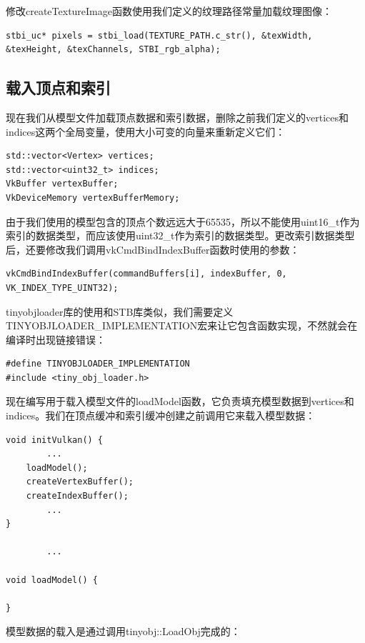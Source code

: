 \documentclass{ctexart}
\begin{document}
修改createTextureImage函数使用我们定义的纹理路径常量加载纹理图像：

\begin{lstlisting}[language={[ANSI]C}]
stbi_uc* pixels = stbi_load(TEXTURE_PATH.c_str(), &texWidth, &texHeight, &texChannels, STBI_rgb_alpha);
\end{lstlisting}

\subsection{载入顶点和索引}

现在我们从模型文件加载顶点数据和索引数据，删除之前我们定义的vertices和indices这两个全局变量，使用大小可变的向量来重新定义它们：

\begin{lstlisting}[language={[ANSI]C}]
std::vector<Vertex> vertices;
std::vector<uint32_t> indices;
VkBuffer vertexBuffer;
VkDeviceMemory vertexBufferMemory;
\end{lstlisting}

由于我们使用的模型包含的顶点个数远远大于65535，所以不能使用uint16\_t作为索引的数据类型，而应该使用uint32\_t作为索引的数据类型。更改索引数据类型后，还要修改我们调用vkCmdBindIndexBuffer函数时使用的参数：

\begin{lstlisting}[language={[ANSI]C}]
vkCmdBindIndexBuffer(commandBuffers[i], indexBuffer, 0, VK_INDEX_TYPE_UINT32);
\end{lstlisting}

tinyobjloader库的使用和STB库类似，我们需要定义TINYOBJLOADER\_IMPLEMENTATION宏来让它包含函数实现，不然就会在编译时出现链接错误：

\begin{lstlisting}[language={[ANSI]C}]
#define TINYOBJLOADER_IMPLEMENTATION
#include <tiny_obj_loader.h>
\end{lstlisting}

现在编写用于载入模型文件的loadModel函数，它负责填充模型数据到vertices和indices。我们在顶点缓冲和索引缓冲创建之前调用它来载入模型数据：

\begin{lstlisting}[language={[ANSI]C}]
void initVulkan() {
		...
	loadModel();
	createVertexBuffer();
	createIndexBuffer();
		...
}

		...

void loadModel() {

}
\end{lstlisting}

模型数据的载入是通过调用tinyobj::LoadObj完成的：
\end{document}
